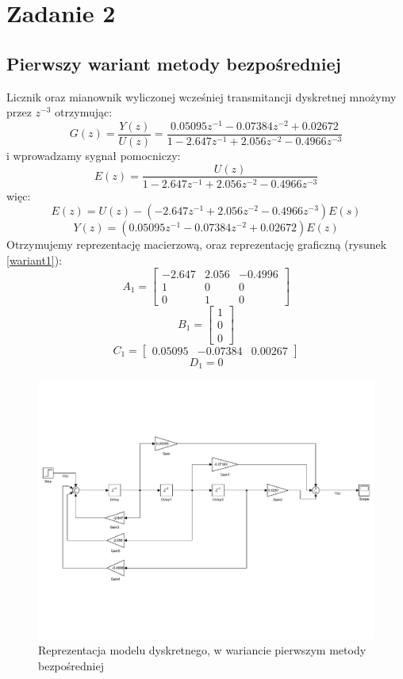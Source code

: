 \documentclass{article}
\begin{document}
\section{Zadanie 2}
\subsection{Pierwszy wariant metody bezpośredniej}
Licznik oraz mianownik wyliczonej wcześniej transmitancji dyskretnej mnożymy przez $z^{-3}$ otrzymując:
\[ G(z)= \frac{Y(z)}{U(z)}= \frac{0.05095 z^{-1} - 0.07384z^{-2} + 0.02672}{1 - 2.647z^{-1} + 2.056z^{-2} - 0.4966z^{-3}} \]
i wprowadzamy sygnał pomocniczy:
\[E(z) = \frac{U(z)}{1 - 2.647z^{-1} + 2.056z^{-2} - 0.4966z^{-3}}\]
więc:
\[E(z) = U(z)-(- 2.647z^{-1} + 2.056z^{-2} - 0.4966z^{-3})E(s)\]
\[Y(z) = (0.05095 z^{-1} - 0.07384z^{-2} + 0.02672)E(z) \]
Otrzymujemy reprezentację macierzową, oraz reprezentację graficzną (rysunek \ref{wariant1}):
\[A_1=\begin{bmatrix}
-2.647 & 2.056 & -0.4996 \\ 1 & 0 & 0 \\ 0 & 1 & 0
\end{bmatrix}\]
\[B_1=\begin{bmatrix}
1 \\ 0 \\ 0
\end{bmatrix}\]
\[C_1=\begin{bmatrix}
0.05095 & -0.07384 & 0.00267
\end{bmatrix}\]
\[D_1 = 0\]
\begin{figure}[h]
\centering
\includegraphics[width=0.8\linewidth]{zad2/wariant1}
\caption{Reprezentacja modelu dyskretnego, w wariancie pierwszym metody bezpośredniej}
\label{fig:wariant1}
\end{figure}
\end{document}
